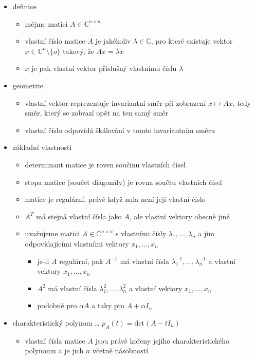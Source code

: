 \begin{itemize}
\begin{itemize}
\item definice
\begin{itemize}
\item mějme matici $A\in\mathbb C^{n\times n}$
\item vlastní číslo matice $A$ je jakékoliv $\lambda\in\mathbb C$, pro které existuje vektor $x\in\mathbb C^n\setminus \lbrace o\rbrace$ takový, že $Ax=\lambda x$
\item $x$ je pak vlastní vektor příslušný vlastnímu číslu $\lambda$
\end{itemize}
\item geometrie
\begin{itemize}
\item vlastní vektor reprezentuje invariantní směr při zobrazení $x\mapsto Ax$, tedy směr, který se zobrazí opět na ten samý směr
\item vlastní číslo odpovídá škálování v tomto invariantním směru
\end{itemize}
\item základní vlastnosti
\begin{itemize}
\item determinant matice je roven součinu vlastních čísel
\item stopa matice (součet diagonály) je rovna součtu vlastních čísel
\item matice je regulární, právě když nula není její vlastní číslo
\item $A^T$ má stejná vlastní čísla jako $A$, ale vlastní vektory obecně jiné
\item uvažujeme matici $A\in\mathbb C^{n\times n}$ s vlastními čísly $\lambda_1,\dots,\lambda_n$ a jim odpovídajícími vlastními vektory $x_1,\dots,x_n$
\begin{itemize}
\item je-li $A$ regulární, pak $A^{-1}$ má vlastní čísla $\lambda_1^{-1},\dots,\lambda_n^{-1}$ a vlastní vektory $x_1,\dots,x_n$
\item $A^2$ má vlastní čísla $\lambda_1^{2},\dots,\lambda_n^{2}$ a vlastní vektory $x_1,\dots,x_n$
\item podobně pro $\alpha A$ a taky pro $A+\alpha I_n$
\end{itemize}
\end{itemize}
\item charakteristický polynom \dots{} $p_A(t)=\mathrm{det}(A-tI_n)$
\begin{itemize}
\item vlastní čísla matice $A$ jsou právě kořeny jejího charakteristického polynomu a je jich $n$ včetně násobností

\end{itemize}
\end{itemize}
\end{itemize}
